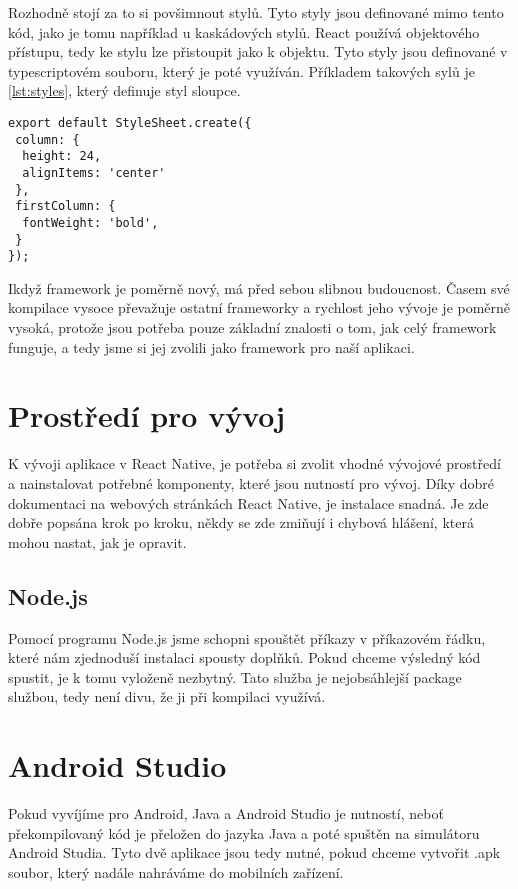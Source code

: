 \documentclass[11pt,twoside,a4paper]{book}
\begin{document}
Rozhodně stojí za to si povšimnout stylů. Tyto styly jsou definované mimo tento kód, jako je tomu například u kaskádových stylů. React používá objektového přístupu, tedy ke stylu lze přistoupit jako k objektu. Tyto styly jsou definované v typescriptovém souboru, který je poté využíván. Příkladem takových sylů je \ref{lst:styles}, který definuje styl sloupce.

\begin{minipage}{\linewidth}
\begin{lstlisting}[caption=Příklad nastavení stylů, label={lst:styles}]
export default StyleSheet.create({
 column: {
  height: 24,
  alignItems: 'center'
 },
 firstColumn: {
  fontWeight: 'bold',
 }
});
\end{lstlisting}
\end{minipage}

Ikdyž framework je poměrně nový, má před sebou slibnou budoucnost. Časem své kompilace vysoce převažuje ostatní frameworky a rychlost jeho vývoje je poměrně vysoká, protože jsou potřeba pouze základní znalosti o tom, jak celý framework funguje, a tedy jsme si jej zvolili jako framework pro naší aplikaci.

\section{Prostředí pro vývoj}
K vývoji aplikace v React Native, je potřeba si zvolit vhodné vývojové prostředí a nainstalovat potřebné komponenty, které jsou nutností pro vývoj. Díky dobré dokumentaci na webových stránkách React Native, je instalace snadná. Je zde dobře popsána krok po kroku, někdy se zde zmiňují i chybová hlášení, která mohou nastat, jak je opravit.

\subsection{Node.js}
Pomocí programu Node.js jsme schopni spouštět příkazy v příkazovém řádku, které nám zjednoduší instalaci spousty doplňků. Pokud chceme výsledný kód spustit, je k tomu vyloženě nezbytný. Tato služba je nejobsáhlejší package službou, tedy není divu, že ji při kompilaci využívá.

\section{Android Studio}
Pokud vyvíjíme pro Android, Java a Android Studio je nutností, neboť překompilovaný kód je přeložen do jazyka Java a poté spuštěn na simulátoru Android Studia. Tyto dvě aplikace jsou tedy nutné, pokud chceme vytvořit .apk soubor, který nadále nahráváme do mobilních zařízení.
\end{document}
